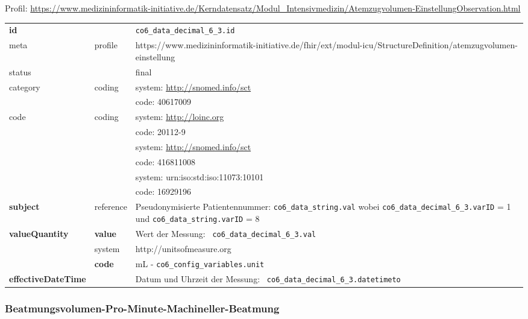 Profil: \url{https://www.medizininformatik-initiative.de/Kerndatensatz/Modul_Intensivmedizin/Atemzugvolumen-EinstellungObservation.html}

\clearpage

\begin{longtable}{|l|l|p{7.5cm}|}
        \hline
        \rowcolor{lightgray} \multicolumn{3}{|l|}{Data Mapping (inhaltlich)} \\ \hline
        \textbf{id} &  & \texttt{co6\_data\_decimal\_6\_3.id} \\ \hline
	meta & profile & https://www.medizininformatik-initiative.de/fhir/ext/modul-icu/StructureDefinition/atemzugvolumen-einstellung \\ \hline 
	status &  & final   \\ \hline 
	category & coding & system: \url{http://snomed.info/sct} \\
\cline{3-3}
	& & code: 40617009 \\ \hline
	code & coding & system: \url{http://loinc.org} \\ 
	\cline{3-3} 
	 &  & code: 20112-9 \\ 
	 \cline{3-3} 
	 &  & system: \url{http://snomed.info/sct} \\ 
	 \cline{3-3} 
	 &  & code: 416811008 \\ 
	 \cline{3-3} 
	 &  & system: urn:iso:std:iso:11073:10101 \\ 
	 \cline{3-3}
	 &  & code: 16929196 \\ \hline
	 \textbf{subject} & reference & Pseudonymisierte Patientennummer: \texttt{co6\_data\_string.val} wobei \texttt{co6\_data\_decimal\_6\_3.varID} = 1 und \texttt{co6\_data\_string.varID} = 8 \\ \hline
	 \textbf{valueQuantity}  & \textbf{value} & Wert der Messung: \texttt{
co6\_data\_decimal\_6\_3.val} \\
        \cline{2-3}
         & system & http://unitsofmeasure.org \\
         \cline{2-3}
         & \textbf{code} & mL - \texttt{co6\_config\_variables.unit}
\\ \hline
     \textbf{effectiveDateTime}  & & Datum und Uhrzeit der Messung: \texttt{
co6\_data\_decimal\_6\_3.datetimeto} \\
     \hline
\end{longtable}


\subsubsection{Beatmungsvolumen-Pro-Minute-Machineller-Beatmung} 

